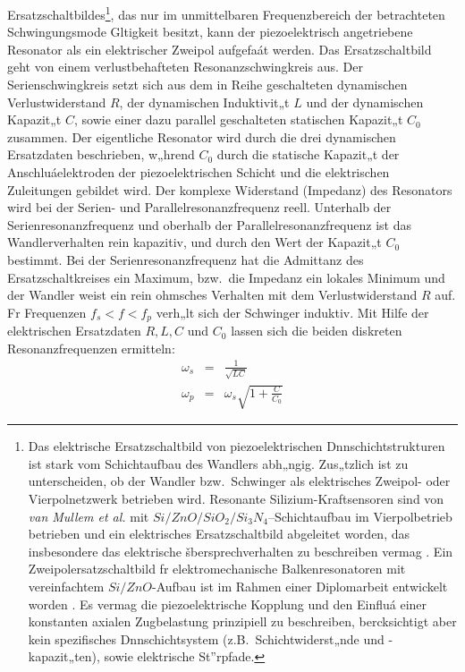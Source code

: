 Ersatzschaltbildes\footnote{Das elektrische Ersatzschaltbild von
piezoelektrischen Dnnschichtstrukturen ist stark vom Schichtaufbau des
Wandlers abh„ngig. Zus„tzlich ist zu unterscheiden, ob der Wandler bzw.\
Schwinger als elektrisches Zweipol- oder Vierpolnetzwerk betrieben wird.
Resonante Silizium-Kraftsensoren sind von {\sl van Mullem et al.} mit
$Si/ZnO/SiO_{2}/Si_{3}N_{4}$--Schichtaufbau im Vierpolbetrieb betrieben
und ein elektrisches Ersatzschaltbild abgeleitet worden, das insbesondere
das elektrische šbersprechverhalten zu beschreiben vermag \cite{Mul92}.
Ein Zweipolersatzschaltbild fr elektromechanische Balkenresonatoren mit
vereinfachtem $Si/ZnO$-Aufbau ist im Rahmen einer Diplomarbeit entwickelt
worden \cite{Qui93}. Es vermag die piezoelektrische Kopplung und den Einfluá
einer konstanten axialen Zugbelastung prinzipiell zu beschreiben,
bercksichtigt aber kein spezifisches Dnnschichtsystem (z.B.\
Schichtwiderst„nde und -kapazit„ten), sowie elektrische St”rpfade.},
das nur im unmittelbaren Frequenzbereich der
betrachteten Schwingungsmode Gltigkeit besitzt, kann der piezoelektrisch
angetriebene Resonator als ein elektrischer Zweipol aufgefaát werden.
Das Ersatzschaltbild geht von einem verlustbehafteten Resonanzschwingkreis
aus. Der Serienschwingkreis setzt sich aus dem in Reihe geschalteten
dynamischen Verlustwiderstand $R$, der dynamischen Induktivit„t $L$ und der
dynamischen Kapazit„t $C$, sowie einer dazu parallel geschalteten statischen
Kapazit„t $C_{0}$ zusammen. Der eigentliche Resonator wird durch die drei
dynamischen Ersatzdaten beschrieben, w„hrend $C_{0}$ durch die statische
Kapazit„t der Anschluáelektroden der piezoelektrischen Schicht und die
elektrischen Zuleitungen gebildet wird. Der komplexe Widerstand (Impedanz)
des Resonators wird bei der Serien- und Parallelresonanzfrequenz reell.
Unterhalb der Serienresonanzfrequenz und oberhalb der
Parallelresonanzfrequenz ist das Wandlerverhalten rein kapazitiv, und durch
den Wert der Kapazit„t $C_{0}$ bestimmt. Bei der
Serienresonanzfrequenz hat die Admittanz des Ersatzschaltkreises ein
Maximum, bzw.\ die Impedanz ein lokales Minimum und der Wandler weist ein
rein ohmsches Verhalten mit dem Verlustwiderstand $R$ auf. Fr Frequenzen
$f_{s} < f < f_{p}$ verh„lt sich der Schwinger induktiv. Mit Hilfe der
elektrischen Ersatzdaten $R, L, C$ und $C_{0}$ lassen sich die
beiden diskreten Resonanzfrequenzen ermitteln:
\begin{eqnarray}
\label{fserfpar}
 \omega_{s}   & = & \frac{1}{\sqrt{LC}} \nonumber \\
 \omega_{p}   & = & \omega_{s} \sqrt{1+\frac{C}{C_{0}}}
\end{eqnarray}
